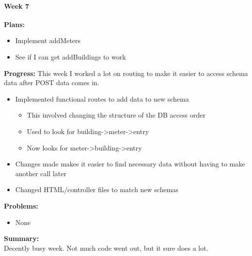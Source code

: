 \paragraph{Week 7}
\begin{adjustwidth}{2.5em}{0pt}
    \vspace{-0.5cm}\textbf{Plans:}
    \vspace{-0.5cm}
    \begin{itemize}
        \item Implement addMeters 
		\item See if I can get addBuildings to work 
    \end{itemize} 
    \vspace{-0.3cm}\textbf{Progress:}
	\noindent This week I worked a lot on routing to make it easier to access schema data after POST data comes in.
    \vspace{-0.5cm}
    \begin{itemize}
        \item Implemented functional routes to add data to new schema
		\begin{itemize}
			\item This involved changing the structure of the DB access order
			\item Used to look for building->meter->entry 
			\item Now looks for meter->building->entry 
		\end{itemize}
		\item Changes made makes it easier to find necessary data without having to make another call later 
		\item Changed HTML/controller files to match new schemas 
    \end{itemize} 
    \vspace{-0.3cm}\textbf{Problems:}
    \vspace{-0.5cm}
    \begin{itemize}
        \item None
    \end{itemize}  
    \vspace{-0.3cm}\noindent\textbf{Summary:}\\
    \noindent Decently busy week. Not much code went out, but it sure does a lot.
	\end{adjustwidth} 
